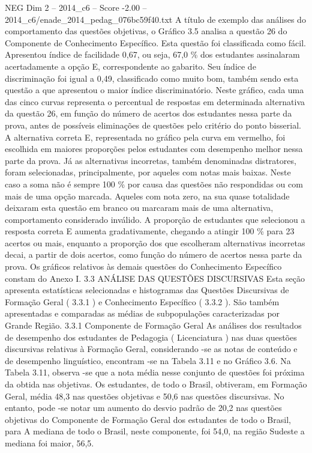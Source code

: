 \begin{textsample}{NEG Dim 2 – 2014\_c6 – Score -2.00 – 2014\_c6/enade\_2014\_pedag\_076bc59f40.txt}
A título de exemplo das análises do comportamento das questões objetivas, o Gráfico 3.5 analisa a questão 26 do Componente de Conhecimento Específico.
Esta questão foi classificada como fácil.
Apresentou índice de facilidade 0,67, ou seja, 67,0 \% dos estudantes assinalaram acertadamente a opção E, correspondente ao gabarito.
Seu índice de discriminação foi igual a 0,49, classificado como muito bom, também sendo esta questão a que apresentou o maior índice discriminatório.
Neste gráfico, cada uma das cinco curvas representa o percentual de respostas em determinada alternativa da questão 26, em função do número de acertos dos estudantes nessa parte da prova, antes de possíveis eliminações de questões pelo critério do ponto bisserial.
A alternativa correta E, representada no gráfico pela curva em vermelho, foi escolhida em maiores proporções pelos estudantes com desempenho melhor nessa parte da prova.
Já as alternativas incorretas, também denominadas distratores, foram selecionadas, principalmente, por aqueles com notas mais baixas.
Neste caso a soma não é sempre 100 \% por causa das questões não respondidas ou com mais de uma opção marcada.
Aqueles com nota zero, na sua quase totalidade deixaram esta questão em branco ou marcaram mais de uma alternativa, comportamento considerado inválido.
A proporção de estudantes que selecionou a resposta correta E aumenta gradativamente, chegando a atingir 100 \% para 23 acertos ou mais, enquanto a proporção dos que escolheram alternativas incorretas decai, a partir de dois acertos, como função do número de acertos nessa parte da prova.
Os gráficos relativos às demais questões do Conhecimento Específico constam do Anexo I. 3.3 ANÁLISE DAS QUESTÕES DISCURSIVAS Esta seção apresenta estatísticas selecionadas e histogramas das Questões Discursivas de Formação Geral ( 3.3.1 ) e Conhecimento Específico ( 3.3.2 ).
São também apresentadas e comparadas as médias de subpopulações caracterizadas por Grande Região. 3.3.1 Componente de Formação Geral As análises dos resultados de desempenho dos estudantes de Pedagogia ( Licenciatura ) nas duas questões discursivas relativas à Formação Geral, considerando -se as notas de conteúdo e de desempenho linguístico, encontram -se na Tabela 3.11 e no Gráfico 3.6.
Na Tabela 3.11, observa -se que a nota média nesse conjunto de questões foi próxima da obtida nas objetivas.
Os estudantes, de todo o Brasil, obtiveram, em Formação Geral, média 48,3 nas questões objetivas e 50,6 nas questões discursivas.
No entanto, pode -se notar um aumento do desvio padrão de 20,2 nas questões objetivas do Componente de Formação Geral dos estudantes de todo o Brasil, para A mediana de todo o Brasil, neste componente, foi 54,0, na região Sudeste a mediana foi maior, 56,5.

\end{textsample}
